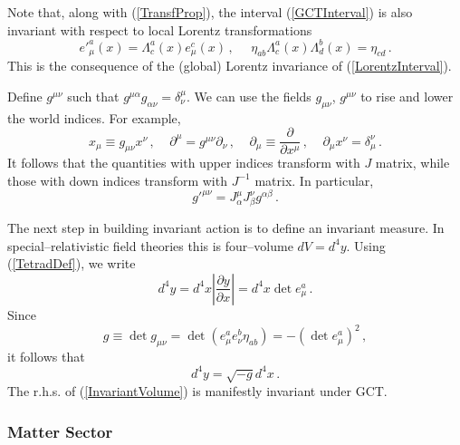 \documentclass[11pt,a4paper]{article}
\begin{document}
Note that, along with (\ref{TransfProp}), the interval (\ref{GCTInterval}) is also invariant with respect to local Lorentz transformations
\begin{equation}
e'^a_\mu(x)=\Lambda^a_c(x)e^c_\mu(x) \,, ~~~~~~ \eta_{ab}\Lambda^a_c(x)\Lambda^b_d(x)=\eta_{cd} \,.
\end{equation}
This is the consequence of the (global) Lorentz invariance of (\ref{LorentzInterval}).

Define $g^{\mu\nu}$ such that $g^{\mu\alpha}g_{\alpha\nu}=\delta^\mu_\nu$. We can use the fields $g_{\mu\nu}$, $g^{\mu\nu}$ to rise and lower the world indices. For example,
\begin{equation}
x_\mu\equiv g_{\mu\nu}x^\nu \,, ~~~~~ \partial^\mu=g^{\mu\nu}\partial_\nu \,, ~~~~~ \partial_\mu\equiv \dfrac{\partial}{\partial x^\mu} \,, ~~~~~\partial_\mu x^\nu=\delta^\nu_\mu \,.
\end{equation}
It follows that the quantities with upper indices transform with $J$ matrix, while those with down indices transform with $J^{-1}$ matrix. In particular,
\begin{equation}
g'^{\mu\nu}=J^\mu_\alpha J^\nu_\beta g^{\alpha\beta} \,.
\end{equation}

The next step in building invariant action is to define an invariant measure. In special--relativistic field theories this is four--volume $dV=d^4y$. Using (\ref{TetradDef}), we write
\begin{equation}
d^4y=d^4x \left\vert\dfrac{\partial y}{\partial x}\right\vert=d^4x\det e^a_\mu \,.
\end{equation}
Since
\begin{equation}
g\equiv\det g_{\mu\nu}=\det (e^a_\mu e^b_\nu\eta_{ab})=-(\det e^a_\mu)^2 \,,
\end{equation}
it follows that
\begin{equation}\label{InvariantVolume}
d^4y=\sqrt{-g}d^4x \,.
\end{equation}
The r.h.s. of (\ref{InvariantVolume}) is manifestly invariant under GCT.

\subsubsection{Matter Sector}
\end{document}
